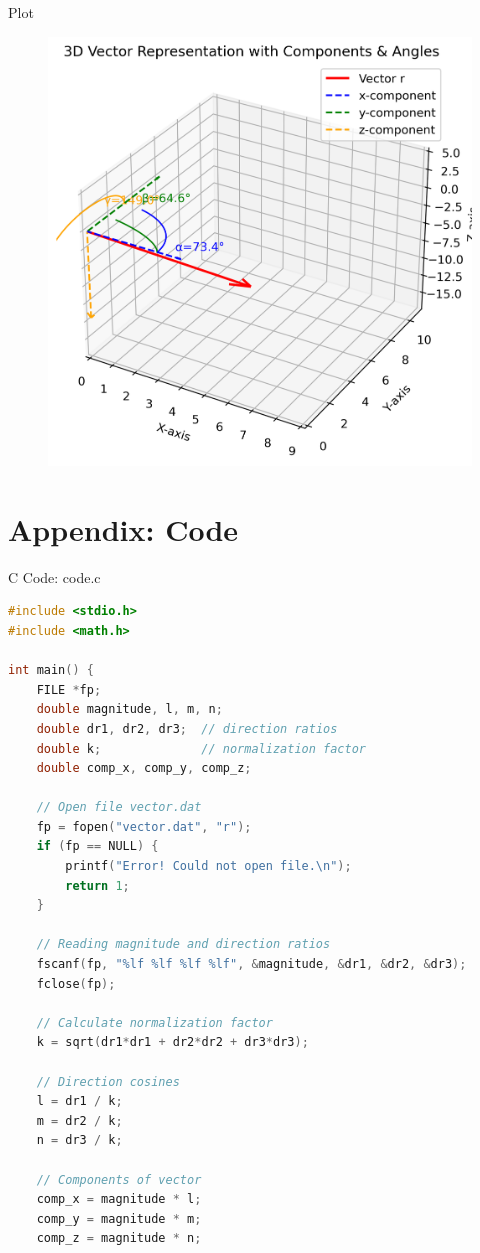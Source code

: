 \documentclass{beamer}
\numberwithin{equation}{section}
\theoremstyle{remark}
\begin{document}
\begin{frame}{Plot}
     \begin{figure}[h!]
   \centering
   \includegraphics[width=0.5\linewidth]{figs/01.png}
   \caption{}
   \label{}
\end{figure}
\end{frame}

\section*{Appendix: Code}

\begin{frame}[fragile]{C Code: code.c}
\begin{lstlisting}[language=C]
#include <stdio.h>
#include <math.h>

int main() {
    FILE *fp;
    double magnitude, l, m, n;
    double dr1, dr2, dr3;  // direction ratios
    double k;              // normalization factor
    double comp_x, comp_y, comp_z;

    // Open file vector.dat
    fp = fopen("vector.dat", "r");
    if (fp == NULL) {
        printf("Error! Could not open file.\n");
        return 1;
    }

    // Reading magnitude and direction ratios
    fscanf(fp, "%lf %lf %lf %lf", &magnitude, &dr1, &dr2, &dr3);
    fclose(fp);

    // Calculate normalization factor
    k = sqrt(dr1*dr1 + dr2*dr2 + dr3*dr3);

    // Direction cosines
    l = dr1 / k;
    m = dr2 / k;
    n = dr3 / k;

    // Components of vector
    comp_x = magnitude * l;
    comp_y = magnitude * m;
    comp_z = magnitude * n;
\end{lstlisting}
\end{frame}
\end{document}
